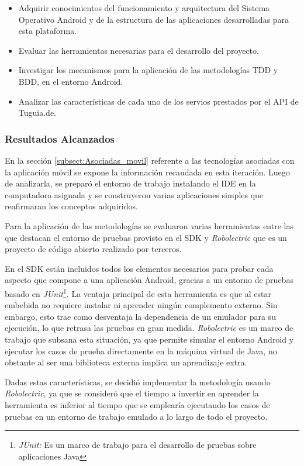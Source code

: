 \begin{itemize}
\item Adquirir conocimientos del funcionamiento y arquitectura del Sistema Operativo Android y de la estructura de las aplicaciones desarrolladas para esta plataforma.
\item Evaluar las herramientas necesarias para el desarrollo del proyecto.
\item Investigar los mecanismos para la aplicación de las metodologías TDD y BDD, en el entorno Android.
\item Analizar las características de cada uno de los servios prestados por el API de Tuguia.de. 
\end{itemize}

\subsubsection{Resultados Alcanzados}

En la sección \ref{subsect:Asociadas_movil} referente a las tecnologías asociadas con la aplicación móvil se expone la información recaudada en esta iteración. Luego de analizarla, se preparó  el entorno de trabajo instalando el IDE en la computadora asignada y se  construyeron varias aplicaciones simples que reafirmaran los conceptos adquiridos.

Para la aplicación de las metodologías se evaluaron varias herramientas entre las que destacan el entorno de pruebas provisto en el SDK y \textit{Robolectric} que es un proyecto de código abierto realizado por terceros.

En el SDK están incluidos todos los elementos necesarios para probar cada aspecto que compone a una aplicación Android, gracias a un entorno de pruebas basado en \textit{JUnit}\footnote{\textit{JUnit:} Es un marco de trabajo para el desarrollo de pruebas sobre aplicaciones Java\cite{JUNIT}}. La ventaja principal de esta herramienta es que al estar embebida no requiere instalar ni aprender ningún complemento externo. Sin embargo, esto trae como desventaja la dependencia de un emulador para su ejecución, lo que retrasa las pruebas en gran medida. \textit{Robolectric} es un marco de trabajo que subsana esta situación, ya que permite simular el entorno Android y ejecutar los casos de prueba directamente en la máquina virtual de Java, no obstante al ser una biblioteca externa implica un aprendizaje extra.

Dadas estas características, se decidió implementar la metodología usando \textit{Robolectric}, ya que se consideró que el tiempo a invertir en aprender la herramienta es inferior al tiempo que se emplearía ejecutando los casos de pruebas en un entorno de trabajo emulado a lo largo de todo el proyecto.

